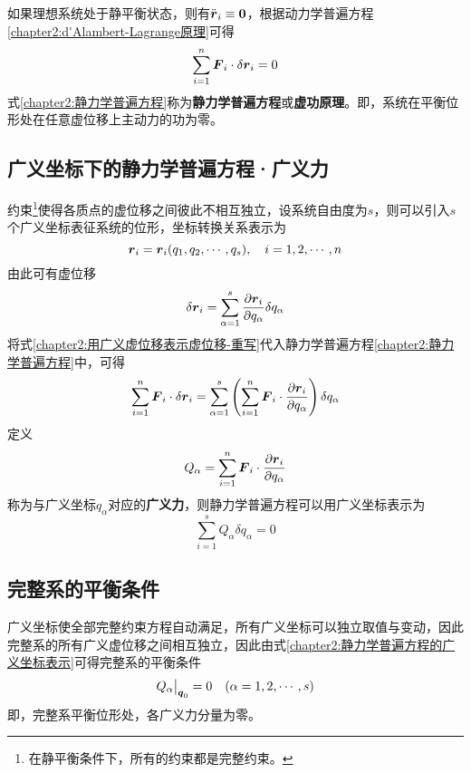 如果理想系统处于静平衡状态，则有$\ddot{\boldsymbol{r}}_i\equiv\boldsymbol{0}$，根据动力学普遍方程\eqref{chapter2:d'Alambert-Lagrange原理}可得
\begin{equation}
	\sum_{i=1}^n \boldsymbol{F}_i\cdot \delta \boldsymbol{r}_i = 0
	\label{chapter2:静力学普遍方程}
\end{equation}
式\eqref{chapter2:静力学普遍方程}称为{\bf 静力学普遍方程}或{\bf 虚功原理}。即，系统在平衡位形处在任意虚位移上主动力的功为零。

\subsection{广义坐标下的静力学普遍方程·广义力}\label{chapter2:subsection-广义坐标下的静力学普遍方程·广义力}

约束\footnote{在静平衡条件下，所有的约束都是完整约束。}使得各质点的虚位移之间彼此不相互独立，设系统自由度为$s$，则可以引入$s$个广义坐标表征系统的位形，坐标转换关系表示为
\begin{equation}
	\boldsymbol{r}_i = \boldsymbol{r}_i(q_1,q_2,\cdots,q_s),\quad i = 1,2,\cdots,n
\end{equation}
由此可有虚位移
\begin{equation}
	\delta \boldsymbol{r}_i = \sum_{\alpha=1}^s \frac{\partial \boldsymbol{r}_i}{\partial q_\alpha} \delta q_\alpha
	\label{chapter2:用广义虚位移表示虚位移-重写}
\end{equation}
将式\eqref{chapter2:用广义虚位移表示虚位移-重写}代入静力学普遍方程\eqref{chapter2:静力学普遍方程}中，可得
\begin{equation*}
	\sum_{i=1}^n \boldsymbol{F}_i \cdot \delta \boldsymbol{r}_i = \sum_{\alpha=1}^s \left(\sum_{i=1}^n \boldsymbol{F}_i \cdot \frac{\partial \boldsymbol{r}_i}{\partial q_\alpha}\right)\delta q_\alpha
\end{equation*}
定义
\begin{equation}
	Q_\alpha = \sum_{i=1}^n \boldsymbol{F}_i \cdot \frac{\partial \boldsymbol{r}_i}{\partial q_\alpha}
	\label{chapter2:广义力的定义式}
\end{equation}
称为与广义坐标$q_\alpha$对应的{\bf 广义力}，则静力学普遍方程可以用广义坐标表示为
\begin{equation}
	\sum_{i=1}^s Q_\alpha \delta q_\alpha = 0
	\label{chapter2:静力学普遍方程的广义坐标表示}
\end{equation}

\subsection{完整系的平衡条件}

广义坐标使全部完整约束方程自动满足，所有广义坐标可以独立取值与变动，因此完整系的所有广义虚位移之间相互独立，因此由式\eqref{chapter2:静力学普遍方程的广义坐标表示}可得完整系的平衡条件
\begin{equation}
	Q_\alpha\big|_{\boldsymbol{q}_0} = 0 \quad (\alpha =1,2,\cdots,s)
\end{equation}
即，完整系平衡位形处，各广义力分量为零。

